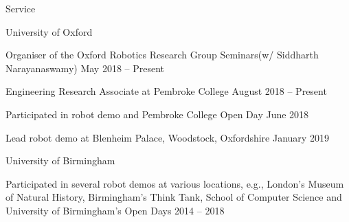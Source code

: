 
\begin{rSection}{Service}

\begin{rSubsection}{University of Oxford}{}{}{}
\item Organiser of the Oxford Robotics Research Group Seminars\newline (w/ Siddharth Narayanaswamy) \hfill May 2018 -- Present
\item Engineering Research Associate at Pembroke College \hfill August 2018 -- Present
\item Participated in robot demo and Pembroke College Open Day \hfill June 2018
\item Lead robot demo at Blenheim Palace, Woodstock, Oxfordshire \hfill January 2019
\end{rSubsection}

\begin{rSubsection}{University of Birmingham}{}{}{}
\item Participated in several robot demos at various locations, e.g., London's  Museum of Natural History, Birmingham's Think Tank,  School of  Computer Science and University of Birmingham's Open Days \hfill 2014 -- 2018
\end{rSubsection}




\end{rSection}
